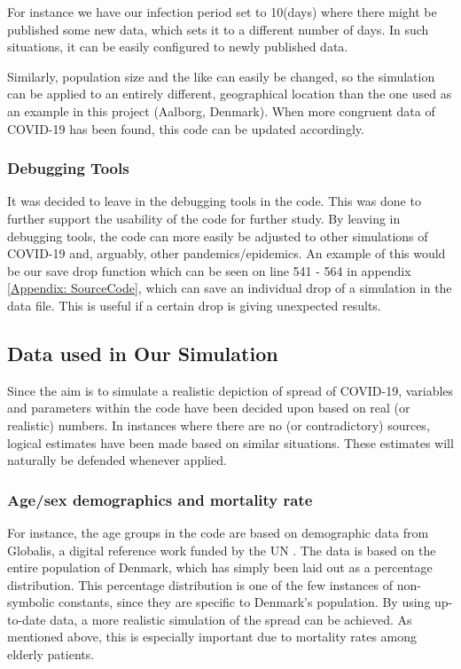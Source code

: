 For instance we have our infection period set to 10(days) where there might be published some new data, which sets it to a different number of days. In such situations, it can be easily configured to newly published data. 

Similarly, population size and the like can easily be changed, so the simulation can be applied to an entirely different, geographical location than the one used as an example in this project (Aalborg, Denmark). When more congruent data of COVID-19 has been found, this code can be updated accordingly. 

\subsubsection{Debugging Tools}

It was decided to leave in the debugging tools in the code. This was done to further support the usability of the code for further study. By leaving in debugging tools, the code can more easily be adjusted to other simulations of COVID-19 and, arguably, other pandemics/epidemics. An example of this would be our save drop function which can be seen on line 541 - 564 in appendix \ref{Appendix: SourceCode}, which can save an individual drop of a simulation in the data file. This is useful if a certain drop is giving unexpected results.

\subsection{Data used in Our Simulation}

Since the aim is to simulate a realistic depiction of spread of COVID-19, variables and parameters within the code have been decided upon based on real (or realistic) numbers. In instances where there are no (or contradictory) sources, logical estimates have been made based on similar situations. These estimates will naturally be defended whenever applied.

\subsubsection{Age/sex demographics and mortality rate}
For instance, the age groups in the code are based on demographic data from Globalis, a digital reference work funded by the UN \citep{globalisdk_danmark_2020}. The data is based on the entire population of Denmark, which has simply been laid out as a percentage distribution. This percentage distribution is one of the few instances of non-symbolic constants, since they are specific to Denmark's population. By using up-to-date data, a more realistic simulation of the spread can be achieved. As mentioned above, this is especially important due to mortality rates among elderly patients.

